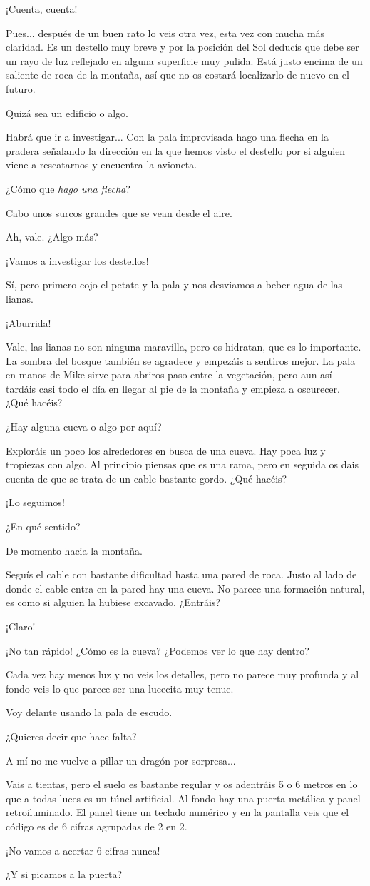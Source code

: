 \documentclass[10pt, a5paper, twocolumn]{article}
\newenvironment{dialogue}
    {\begin{description}[leftmargin=!,align=right,labelwidth=0.cm]}
    {\end{description}}
\newcommand\A{\item[\raisebox{-0.25em}{\scalebox{0.75}{\bctetraedre}}]}
\newcommand\B{\item[\raisebox{-0.25em}{\scalebox{0.75}{\bccube}}]}
\newcommand\E{\item[\raisebox{-0.25em}{\scalebox{0.75}{\bcicosaedre}}]}
\begin{document}
\begin{dialogue}
        \A ¡Cuenta, cuenta!
        \E Pues... después de un buen rato lo veis otra vez, esta vez con mucha más claridad. Es un destello muy breve y por la posición del Sol deducís que debe ser un rayo de luz reflejado en alguna superficie muy pulida. Está justo encima de un saliente de roca de la montaña, así que no os costará localizarlo de nuevo en el futuro.
        \A Quizá sea un edificio o algo.
        \B Habrá que ir a investigar... Con la pala improvisada hago una flecha en la pradera señalando la dirección en la que hemos visto el destello por si alguien viene a rescatarnos y encuentra la avioneta.
        \E ¿Cómo que \emph{hago una flecha}?
        \B Cabo unos surcos grandes que se vean desde el aire.
        \E Ah, vale. ¿Algo más?
        \A ¡Vamos a investigar los destellos!
        \B Sí, pero primero cojo el petate y la pala y nos desviamos a beber agua de las lianas.
        \A ¡Aburrida!
        \E Vale, las lianas no son ninguna maravilla, pero os hidratan, que es lo importante. La sombra del bosque también se agradece y empezáis a sentiros mejor. La pala en manos de Mike sirve para abriros paso entre la vegetación, pero aun así tardáis casi todo el día en llegar al pie de la montaña y empieza a oscurecer. ¿Qué hacéis?
        \A ¿Hay alguna cueva o algo por aquí?
        \E Exploráis un poco los alrededores en busca de una cueva. Hay poca luz y tropiezas con algo. Al principio piensas que es una rama, pero en seguida os dais cuenta de que se trata de un cable bastante gordo. ¿Qué hacéis?
        \B ¡Lo seguimos!
        \E ¿En qué sentido?
        \B De momento hacia la montaña.
        \E Seguís el cable con bastante dificultad hasta una pared de roca. Justo al lado de donde el cable entra en la pared hay una cueva. No parece una formación natural, es como si alguien la hubiese excavado. ¿Entráis?
        \A ¡Claro!
        \B ¡No tan rápido! ¿Cómo es la cueva? ¿Podemos ver lo que hay dentro?
        \E Cada vez hay menos luz y no veis los detalles, pero no parece muy profunda y al fondo veis lo que parece ser una lucecita muy tenue.
        \B Voy delante usando la pala de escudo.
        \A ¿Quieres decir que hace falta?
        \B A mí no me vuelve a pillar un dragón por sorpresa...
        \E Vais a tientas, pero el suelo es bastante regular y os adentráis 5 o 6 metros en lo que a todas luces es un túnel artificial. Al fondo hay una puerta metálica y panel retroiluminado. El panel tiene un teclado numérico y en la pantalla veis que el código es de 6 cifras agrupadas de 2 en 2.
        \B ¡No vamos a acertar 6 cifras nunca!
        \A ¿Y si picamos a la puerta?

\end{dialogue}
\end{document}
